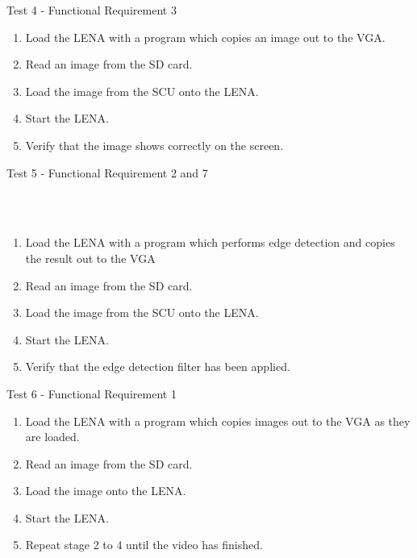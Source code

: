 {\sc Test 4 - Functional Requirement 3}

{\em \FRIII}

\begin{enumerate}
\item Load the \ac{LENA} with a program which copies an image out to the
  \ac{VGA}.
\item Read an image from the \ac{SD} card.
\item Load the image from the \ac{SCU} onto the \ac{LENA}.
\item Start the \ac{LENA}.
\item Verify that the image shows correctly on the screen.
\end{enumerate}

{\sc Test 5 - Functional Requirement 2 and 7}

{\em \FRII}\\\\
{\em \FRVII}

\begin{enumerate}
\item Load the \ac{LENA} with a program which performs edge detection and copies
the result out to the \ac{VGA}
\item Read an image from the \ac{SD} card.
\item Load the image from the \ac{SCU} onto the \ac{LENA}.
\item Start the \ac{LENA}.
\item Verify that the edge detection filter has been applied.
\end{enumerate}

{\sc Test 6 - Functional Requirement 1}

{\em \FRI}

\begin{enumerate}
\item Load the \ac{LENA} with a program which copies images out to the \ac{VGA}
  as they are loaded.
\item Read an image from the \ac{SD} card.
\item Load the image onto the \ac{LENA}.
\item Start the \ac{LENA}.
\item Repeat stage 2 to 4 until the video has finished.
\item Measure the frame rate.
\end{enumerate}

